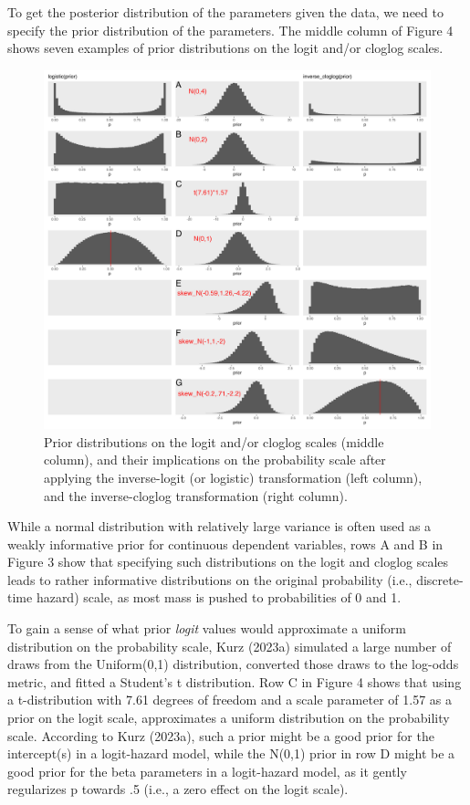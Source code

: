 \documentclass[
  man,floatsintext]{apa6}
\begin{document}
To get the posterior distribution of the parameters given the data, we need to specify the prior distribution of the parameters. The middle column of Figure 4 shows seven examples of prior distributions on the logit and/or cloglog scales.



\begin{figure}[H]

{\centering \includegraphics[width=0.8\linewidth,height=0.67\textheight,]{../Tutorial_2_Bayesian/figures/plot_of_priors} 

}

\caption{Prior distributions on the logit and/or cloglog scales (middle column), and their implications on the probability scale after applying the inverse-logit (or logistic) transformation (left column), and the inverse-cloglog transformation (right column).}\label{fig:plot-priors}
\end{figure}

While a normal distribution with relatively large variance is often used as a weakly informative prior for continuous dependent variables, rows A and B in Figure 3 show that specifying such distributions on the logit and cloglog scales leads to rather informative distributions on the original probability (i.e., discrete-time hazard) scale, as most mass is pushed to probabilities of 0 and 1.

To gain a sense of what prior \emph{logit} values would approximate a uniform distribution on the probability scale, Kurz (2023a) simulated a large number of draws from the Uniform(0,1) distribution, converted those draws to the log-odds metric, and fitted a Student's t distribution. Row C in Figure 4 shows that using a t-distribution with 7.61 degrees of freedom and a scale parameter of 1.57 as a prior on the logit scale, approximates a uniform distribution on the probability scale. According to Kurz (2023a), such a prior might be a good prior for the intercept(s) in a logit-hazard model, while the N(0,1) prior in row D might be a good prior for the beta parameters in a logit-hazard model, as it gently regularizes p towards .5 (i.e., a zero effect on the logit scale).
\end{document}
